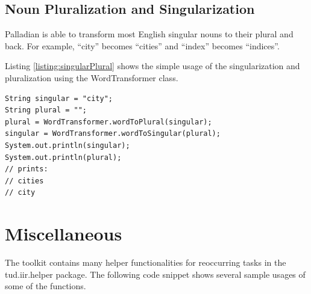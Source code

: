 \documentclass[a4paper,twoside]{book}      %
\begin{document}
\subsection{Noun Pluralization and Singularization}
Palladian is able to transform most English singular nouns to their plural and back. For example, ``city'' becomes ``cities'' and ``index'' becomes ``indices''.

Listing \ref{listing:singularPlural} shows the simple usage of the singularization and pluralization using the WordTransformer class.

\begin{codelisting}
\label{listing:singularPlural}
\begin{lstlisting}[label=listing:singularPlural,caption=Transforming words from singular to plural and vice versa.,frame=tb]
String singular = "city";
String plural = "";
plural = WordTransformer.wordToPlural(singular);
singular = WordTransformer.wordToSingular(plural);
System.out.println(singular);
System.out.println(plural);
// prints:
// cities
// city
\end{lstlisting}
\end{codelisting}

\section{Miscellaneous}
The toolkit contains many helper functionalities for reoccurring tasks in the tud.iir.helper package.
The following code snippet shows several sample usages of some of the functions.
\end{document}
